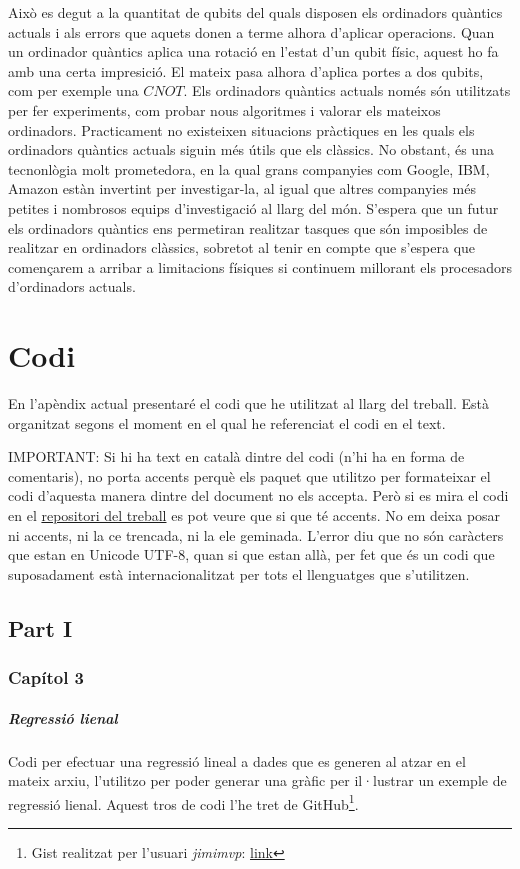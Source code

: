 Això es degut a la quantitat de qubits del quals disposen els ordinadors quàntics actuals i als errors que aquets donen a terme alhora d'aplicar operacions. Quan un ordinador quàntics aplica una rotació en l'estat d'un qubit físic, aquest ho fa amb una certa impresició. El mateix pasa alhora d'aplica portes a dos qubits, com per exemple una $CNOT$. Els ordinadors quàntics actuals només són utilitzats per fer experiments, com probar nous algoritmes i valorar els mateixos ordinadors. Practicament no existeixen situacions pràctiques en les quals els ordinadors quàntics actuals siguin més útils que els clàssics. No obstant, és una tecnonlògia molt prometedora, en la qual grans companyies com Google, IBM, Amazon estàn invertint per investigar-la, al igual que altres companyies més petites i nombrosos equips d'investigació al llarg del món. S'espera que un futur els ordinadors quàntics ens permetiran realitzar tasques que són imposibles de realitzar en ordinadors clàssics, sobretot al tenir en compte que s'espera que començarem a arribar a limitacions físiques si continuem millorant els procesadors d'ordinadors actuals.


\chapter{Codi}
En l'apèndix actual presentaré el codi que he utilitzat al llarg del treball. Està organitzat segons el moment en el qual he referenciat el codi en el text. 

IMPORTANT: Si hi ha text en català dintre del codi (n'hi ha en forma de comentaris), no porta accents perquè els paquet que utilitzo per formateixar el codi d'aquesta manera dintre del document no els accepta. Però si es mira el codi en el \href{https://github.com/tomiock/qGAN}{repositori del treball} es pot veure que si que té accents. No em deixa posar ni accents, ni la ce trencada, ni la ele geminada. L'error diu que no són caràcters que estan en Unicode UTF-8, quan si que estan allà, per fet que és un codi que suposadament està internacionalitzat per tots el llenguatges que s'utilitzen.  

\section{Part I}
\subsection{Capítol 3}

\paragraph{Regressió lienal}
\label{lst:linear_regression}
Codi per efectuar una regressió lineal a dades que es generen al atzar en el mateix arxiu, l'utilitzo per poder generar una gràfic per il·lustrar un exemple de regressió lienal. Aquest tros de codi l'he tret de GitHub\footnote{Gist realitzat per l'usuari \textit{jimimvp}: \href{https://gist.github.com/jimimvp/05ece11fec25d5c8c009af9ba469d6c2}{link}}.

